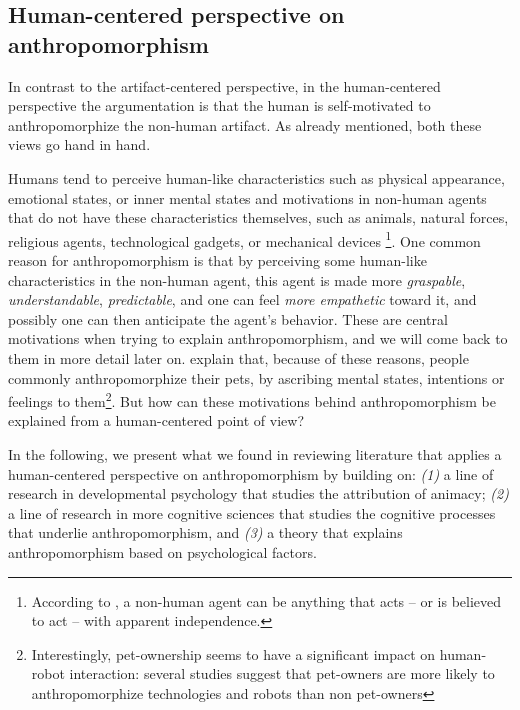 \documentclass{frontiersSCNS} %
\begin{document}

\subsection{Human-centered perspective on anthropomorphism}

In contrast to the artifact-centered perspective, in the human-centered
perspective the argumentation is that the human is self-motivated to
anthropomorphize the non-human artifact. As already mentioned, both these views
go hand in hand.

Humans tend to perceive human-like characteristics such as physical appearance,
emotional states, or inner mental states and motivations in non-human agents
that do not have these characteristics themselves, such as animals, natural
forces, religious agents, technological gadgets, or mechanical devices
\citep{epley_when_2008}\footnote{According to \citet{epley_when_2008}, a
non-human agent can be anything that acts -- or is believed to act -- with
apparent independence.}. One common reason for anthropomorphism is that by
perceiving some human-like characteristics in the non-human agent, this agent is
made more \emph{graspable}, \emph{understandable}, \emph{predictable}, and one
can feel \emph{more empathetic} toward it, and possibly one can then anticipate
the agent's behavior. These are central motivations when trying to explain
anthropomorphism, and we will come back to them in more detail later on.
\citet{eddy_attribution_1993} explain that, because of these reasons, people
commonly anthropomorphize their pets, by ascribing mental states, intentions or
feelings to them\footnote{Interestingly, pet-ownership seems to have a
significant impact on human-robot interaction: several studies suggest that
pet-owners are more likely to anthropomorphize technologies and robots than
non pet-owners}. But how can these motivations behind anthropomorphism be
explained from a human-centered point of view?

In the following, we present what we found in reviewing literature that applies a human-centered perspective on anthropomorphism by building on:
\textit{(1)} a line of research in developmental psychology that studies the attribution of animacy;
\textit{(2)} a line of research in more cognitive sciences that studies the cognitive processes that underlie anthropomorphism, and
\textit{(3)} a theory that explains anthropomorphism based on psychological factors. 
\end{document}

